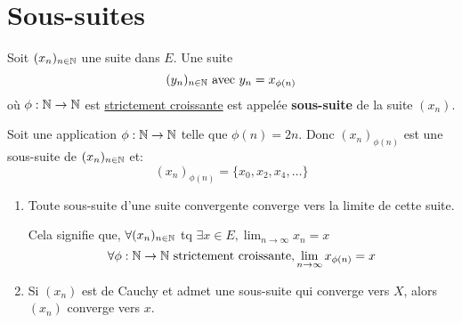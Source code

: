 \section{Sous-suites}
\begin{definition}
    Soit $(x_n)_{n \in \mathbb{N}}$ une suite dans $E$. Une suite  
    \[
        (y_n)_{n \in \mathbb{N}} \text{ avec } y_n = x_{\phi(n)}
    \] 
    où $\phi: \mathbb{N} \to \mathbb{N}$ est \underline{strictement croissante} est appelée \textbf{sous-suite} de la suite $(x_n)$.
\end{definition}
\begin{eg}
    Soit une application $\phi: \mathbb{N} \to \mathbb{N}$ telle que $\phi(n) = 2n$. Donc  $(x_n)_{\phi(n)}$ est une sous-suite de  $(x_n)_{n \in \mathbb{N}}$ et:
    \[
        (x_n)_{\phi(n)} = \{x_0, x_2, x_4, \ldots\}
    \] 
\end{eg}
\begin{prop}
   \begin{enumerate}
       \item Toute sous-suite d'une suite convergente converge vers la limite de cette suite.
           \par
           Cela signifie que, $\forall (x_n)_{n \in \mathbb{N}}$ tq $\exists x \in E, \lim_{n \to \infty} x_n = x$
           \[
               \forall \phi: \mathbb{N} \to \mathbb{N} \text{ strictement croissante}, \lim_{n \to \infty} x_{\phi(n)} = x
           \] 
        \item Si $(x_n)$ est de Cauchy et admet une sous-suite qui converge vers  $X$, alors  $(x_n)$ converge vers  $x$.
   \end{enumerate} 
\end{prop}
